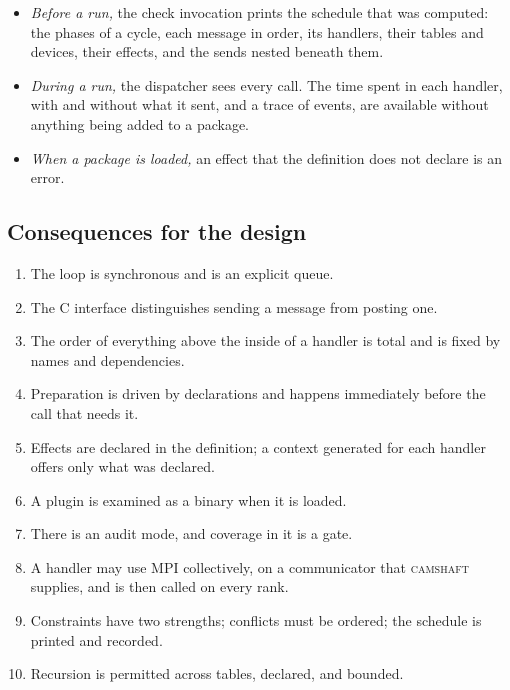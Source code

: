 \documentclass[11pt,a4paper]{article}
\newcommand{\camshaft}{\textsc{camshaft}}
\begin{document}
\begin{itemize}
  \item \emph{Before a run,} the check invocation prints the schedule that
        was computed: the phases of a cycle, each message in order, its
        handlers, their tables and devices, their effects, and the sends
        nested beneath them.
  \item \emph{During a run,} the dispatcher sees every call.  The time spent
        in each handler, with and without what it sent, and a trace of
        events, are available without anything being added to a package.
  \item \emph{When a package is loaded,} an effect that the definition does
        not declare is an error.
\end{itemize}

\subsection{Consequences for the design}

\begin{enumerate}
  \item The loop is synchronous and is an explicit queue.
  \item The C interface distinguishes sending a message from posting one.
  \item The order of everything above the inside of a handler is total and
        is fixed by names and dependencies.
  \item Preparation is driven by declarations and happens immediately
        before the call that needs it.
  \item Effects are declared in the definition; a context generated for
        each handler offers only what was declared.
  \item A plugin is examined as a binary when it is loaded.
  \item There is an audit mode, and coverage in it is a gate.
  \item A handler may use MPI collectively, on a communicator that
        \camshaft{} supplies, and is then called on every rank.
  \item Constraints have two strengths; conflicts must be ordered; the
        schedule is printed and recorded.
  \item Recursion is permitted across tables, declared, and bounded.
\end{enumerate}

\end{document}
